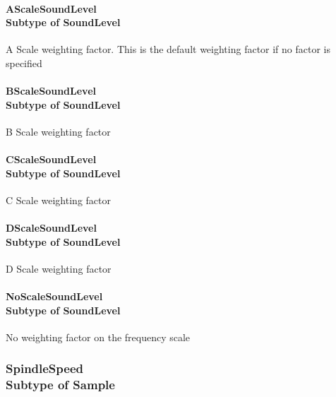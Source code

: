 \paragraph[AScaleSoundLevel]{AScaleSoundLevel \\ {\small Subtype of SoundLevel}}\mbox{}
  \label{type:AScaleSoundLevel}

\FloatBarrier

A Scale weighting factor.   This is the default weighting factor if no factor is specified

\paragraph[BScaleSoundLevel]{BScaleSoundLevel \\ {\small Subtype of SoundLevel}}\mbox{}
  \label{type:BScaleSoundLevel}

\FloatBarrier

B Scale weighting factor

\paragraph[CScaleSoundLevel]{CScaleSoundLevel \\ {\small Subtype of SoundLevel}}\mbox{}
  \label{type:CScaleSoundLevel}

\FloatBarrier

C Scale weighting factor

\paragraph[DScaleSoundLevel]{DScaleSoundLevel \\ {\small Subtype of SoundLevel}}\mbox{}
  \label{type:DScaleSoundLevel}

\FloatBarrier

D Scale weighting factor

\paragraph[NoScaleSoundLevel]{NoScaleSoundLevel \\ {\small Subtype of SoundLevel}}\mbox{}
  \label{type:NoScaleSoundLevel}

\FloatBarrier

No weighting factor on the frequency scale

\FloatBarrier
\subsubsection[SpindleSpeed]{SpindleSpeed \\ {\small Subtype of Sample}}
  \label{type:SpindleSpeed}


